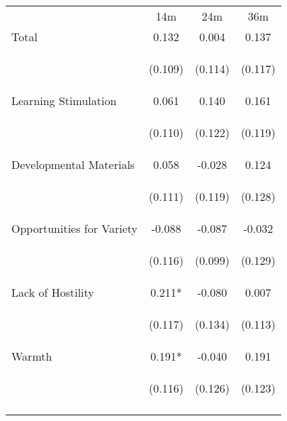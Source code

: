 \begin{tabular}{lccc}
\hline \noalign{\smallskip} & 14m & 24m & 36m\\
\noalign{\smallskip}\hline \noalign{\smallskip}Total & 0.132 & 0.004 & 0.137\\
 & \begin{footnotesize}(0.109)\end{footnotesize} & \begin{footnotesize}(0.114)\end{footnotesize} & \begin{footnotesize}(0.117)\end{footnotesize}\\
\noalign{\smallskip}Learning Stimulation & 0.061 & 0.140 & 0.161\\
 & \begin{footnotesize}(0.110)\end{footnotesize} & \begin{footnotesize}(0.122)\end{footnotesize} & \begin{footnotesize}(0.119)\end{footnotesize}\\
\noalign{\smallskip}Developmental Materials & 0.058 & -0.028 & 0.124\\
 & \begin{footnotesize}(0.111)\end{footnotesize} & \begin{footnotesize}(0.119)\end{footnotesize} & \begin{footnotesize}(0.128)\end{footnotesize}\\
\noalign{\smallskip}Opportunities for Variety & -0.088 & -0.087 & -0.032\\
 & \begin{footnotesize}(0.116)\end{footnotesize} & \begin{footnotesize}(0.099)\end{footnotesize} & \begin{footnotesize}(0.129)\end{footnotesize}\\
\noalign{\smallskip}Lack of Hostility & 0.211* & -0.080 & 0.007\\
 & \begin{footnotesize}(0.117)\end{footnotesize} & \begin{footnotesize}(0.134)\end{footnotesize} & \begin{footnotesize}(0.113)\end{footnotesize}\\
\noalign{\smallskip}Warmth & 0.191* & -0.040 & 0.191\\
 & \begin{footnotesize}(0.116)\end{footnotesize} & \begin{footnotesize}(0.126)\end{footnotesize} & \begin{footnotesize}(0.123)\end{footnotesize}\\
\noalign{\smallskip}\hline\end{tabular}\\

